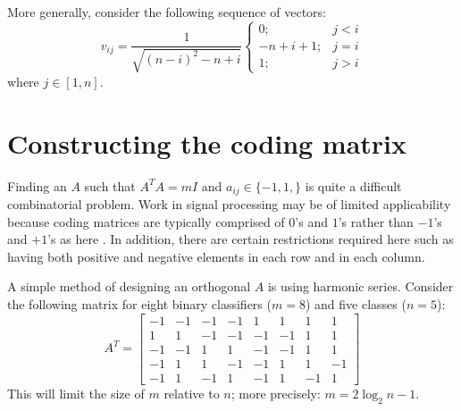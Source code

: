More generally, consider the following sequence of vectors:
\begin{equation}
	v_{ij} = \frac{1}{\sqrt{(n-i)^2-n+i}} \left \lbrace \begin{array}{rl}
			0; & j < i \\
			-n+i+1; & j=i \\
			1; & j > i
		\end{array} \right .
\end{equation}
where $j \in [1, n]$. \citep{Boyd_Vandenberghe2004}


\section{Constructing the coding matrix}

Finding an $A$ such that $A^T A = m I$ and $a_{ij} \in \lbrace -1, 1, \rbrace$
is quite a difficult combinatorial problem.
Work in signal processing may be of limited applicability because coding
matrices are typically comprised of $0$'s and $1$'s rather than $-1$'s and $+1$'s
as here \citep{Hedayat_etal1999,Panse_etal2014}.
In addition, there are certain restrictions required here such as
having both positive and negative elements in each row and in each column.

A simple method of designing an orthogonal $A$ is using harmonic series.
Consider the following matrix for eight binary classifiers ($m=8$) and
five classes ($n=5$):
\begin{equation}
	A^T = \left [ \begin{array}{rrrrrrrr}
			-1 & -1 & -1 & -1 & 1 & 1 & 1 & 1 \\
			 1 &  1 & -1 & -1 & -1 & -1 & 1 & 1 \\
			-1 & -1 & 1 & 1 & -1 & -1 & 1 & 1 \\
			-1 & 1 & 1 & -1 & -1 & 1 & 1 & -1 \\
			-1 & 1 & -1 & 1 & -1 & 1 & -1 & 1
	\end{array} \right ]
\end{equation}
This will limit the size of $m$ relative to $n$; more precisely:
$m=2 \log_2 n - 1$.


